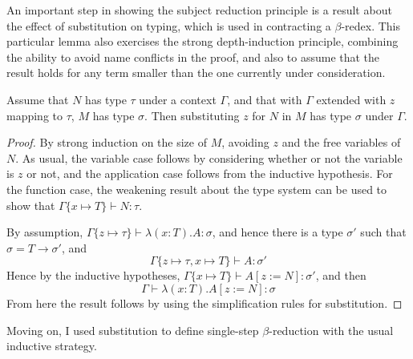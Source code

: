 An important step in showing the subject reduction principle is a result about the effect of substitution on typing, which is used in contracting a \(\beta\)-redex.
This particular lemma also exercises the strong depth-induction principle, combining the ability to avoid name conflicts in the proof, and also to assume that the result holds for any term smaller than the one currently under consideration.

\begin{lemma}
\label{lemma:typing-subst}
Assume that \(N\) has type \(\tau\) under a context \(\Gamma\), and that with \(\Gamma\) extended with \(z\) mapping to \(\tau\), \(M\) has type \(\sigma\).
Then substituting \(z\) for \(N\) in \(M\) has type \(\sigma\) under \(\Gamma\).
\end{lemma}
\begin{proof}
By strong induction on the size of \(M\), avoiding \(z\) and the free variables of \(N\).
As usual, the variable case follows by considering whether or not the variable is \(z\) or not, and the application case follows from the inductive hypothesis.
For the function case, the weakening result about the type system can be used to show that \(\Gamma\{x \mapsto T\} \vdash N : \tau\).

By assumption, \(\Gamma\{z \mapsto \tau\} \vdash \lambda (x:T).A : \sigma\), and hence there is a type \(\sigma'\) such that \(\sigma = T \to \sigma'\), and
\[
\Gamma\{z \mapsto \tau, x \mapsto T\} \vdash A : \sigma'
\]
Hence by the inductive hypotheses, \(\Gamma\{x \mapsto T\} \vdash A[z := N] : \sigma'\), and then
\[
\Gamma \vdash \lambda (x:T). A[z := N] : \sigma
\]
From here the result follows by using the simplification rules for substitution.
\end{proof}

Moving on, I used substitution to define single-step \(\beta\)-reduction with the usual inductive strategy.

